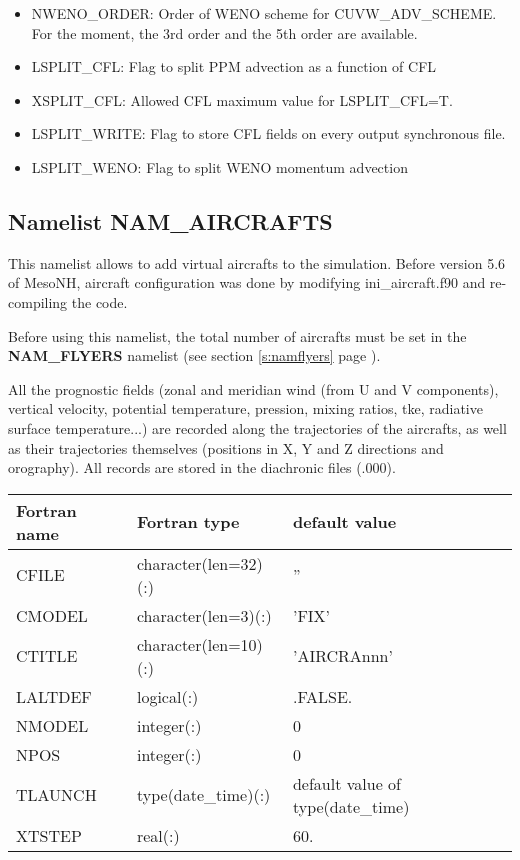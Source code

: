 \begin{itemize}
\item
{}
NWENO\_ORDER: Order of WENO scheme for CUVW\_ADV\_SCHEME. For the moment, 
the 3rd order and the 5th order are available.

\item
{}
LSPLIT\_CFL: Flag to split PPM advection as a function of CFL

\item
{}
XSPLIT\_CFL: Allowed CFL maximum value for LSPLIT\_CFL=T.  

\item
{}
LSPLIT\_WRITE: Flag to store CFL fields on every output synchronous file.

\item
{}
LSPLIT\_WENO: Flag to split WENO momentum advection


\end{itemize}

\subsection{Namelist NAM\_AIRCRAFTS }\label{s:namaircrafts}

This namelist allows to add virtual aircrafts to the simulation. Before version 5.6 of MesoNH, aircraft configuration was done by modifying ini\_aircraft.f90 and re-compiling the code.

Before using this namelist, the total number of aircrafts must be set in the \textbf{NAM\_FLYERS} namelist (see section \ref{s:namflyers} page \pageref{s:namflyers}).

All the prognostic fields (zonal and meridian wind (from U and V components), vertical
velocity, potential temperature, pression, mixing ratios, tke, radiative surface temperature...) are
recorded along the trajectories of the aircrafts, as well as their trajectories themselves (positions
in X, Y and Z directions and orography). All records are stored in the diachronic files (.000).

\vspace{0.5cm}
\begin{longtable} {|p{}|p{}|p{}|}
\hline
Fortran name &  Fortran type & default value \\
\hline
\endhead
\hline
\endfoot
CFILE   & character(len=32)(:) & '' \\
CMODEL  & character(len=3)(:)  & 'FIX' \\
CTITLE  & character(len=10)(:) & 'AIRCRAnnn' \\
LALTDEF & logical(:)           & .FALSE. \\
NMODEL  & integer(:)           & 0 \\
NPOS    & integer(:)           & 0 \\
TLAUNCH & type(date\_time)(:)  & default value of type(date\_time) \\
XTSTEP  & real(:)              & 60. \\
\end{longtable}

